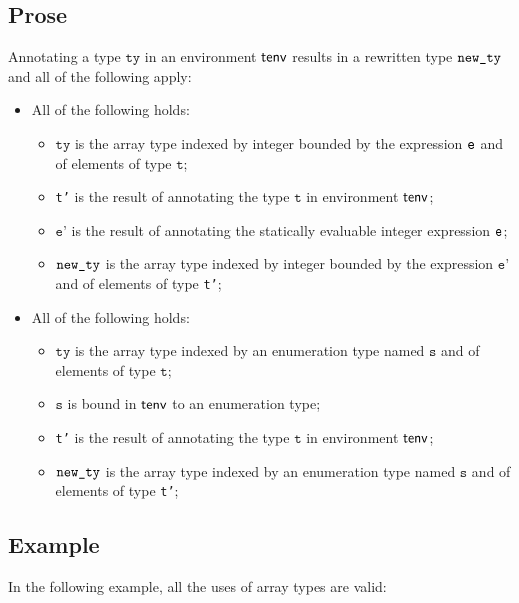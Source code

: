\documentclass{book}
\newcommand\vt[0]{\texttt{t}}
\newcommand\vs[0]{\texttt{s}}
\newcommand\tty[0]{\texttt{ty}}
\newcommand\vep[0]{\texttt{e'}}
\begin{document}
\subsection{Prose}
Annotating a type $\tty$ in an environment $\textsf{tenv}$ results in a
rewritten type $\texttt{new\_ty}$ and all of the following apply:
\begin{itemize}
  \item All of the following holds:
    \begin{itemize}
      \item $\tty$ is the array type indexed by integer bounded by the
        expression $\texttt{e}$ and of elements of type $\vt$;
      \item \texttt{t'} is the result of annotating the type $\vt$ in
        environment $\textsf{tenv}$;
      \item $\vep$ is the result of annotating the statically evaluable
        integer expression $\texttt{e}$;
      \item $\texttt{new\_ty}$ is the array type indexed by integer bounded by
        the expression $\vep$ and of elements of type \texttt{t'};
    \end{itemize}
  \item All of the following holds:
    \begin{itemize}
      \item $\tty$ is the array type indexed by an enumeration type named
        $\vs$ and of elements of type $\vt$;
      \item $\vs$ is bound in $\textsf{tenv}$ to an enumeration type;
      \item \texttt{t'} is the result of annotating the type $\vt$ in
        environment $\textsf{tenv}$;
      \item $\texttt{new\_ty}$ is the array type indexed by an enumeration type
        named $\vs$ and of elements of type \texttt{t'};
    \end{itemize}
\end{itemize}

\subsection{Example}
In the following example, all the uses of array types are valid:




\end{document}
